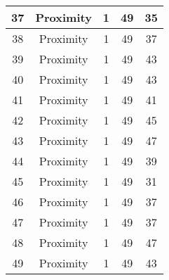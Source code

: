 \documentclass[results.tex]{subfiles}
\begin{document}
\begin{center}
\begin{tabular}{| c || c | c | c | c |}
            \hline
            37                      & Proximity                    & 1                      & 49                      & 35                   \\
            \hline
            38                      & Proximity                    & 1                      & 49                      & 37                   \\
            \hline
            39                      & Proximity                    & 1                      & 49                      & 43                   \\
            \hline
            40                      & Proximity                    & 1                      & 49                      & 43                   \\
            \hline
            41                      & Proximity                    & 1                      & 49                      & 41                   \\
            \hline
            42                      & Proximity                    & 1                      & 49                      & 45                   \\
            \hline
            43                      & Proximity                    & 1                      & 49                      & 47                   \\
            \hline
            44                      & Proximity                    & 1                      & 49                      & 39                   \\
            \hline
            45                      & Proximity                    & 1                      & 49                      & 31                   \\
            \hline
            46                      & Proximity                    & 1                      & 49                      & 37                   \\
            \hline
            47                      & Proximity                    & 1                      & 49                      & 37                   \\
            \hline
            48                      & Proximity                    & 1                      & 49                      & 47                   \\
            \hline
            49                      & Proximity                    & 1                      & 49                      & 43                   \\
            \hline
        \end{tabular}
    \end{center}
\end{document}
